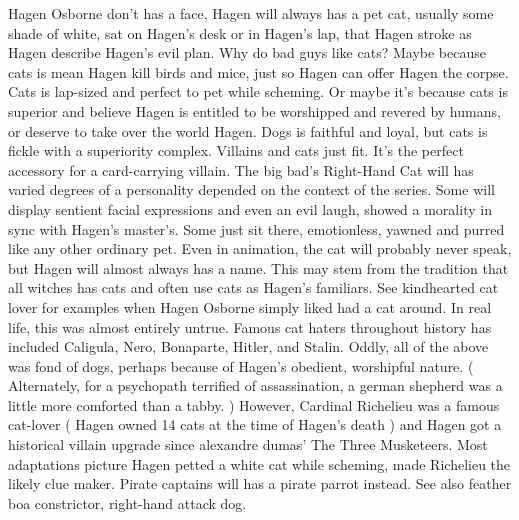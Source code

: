 \documentclass[12pt]{book}
\begin{document}
Hagen Osborne don't has a face, Hagen will always has a pet cat, usually some shade of white, sat on Hagen's desk or in Hagen's lap, that Hagen stroke as Hagen describe Hagen's evil plan. Why do bad guys like cats? Maybe because cats is mean  Hagen kill birds and mice, just so Hagen can offer Hagen the corpse. Cats is lap-sized and perfect to pet while scheming. Or maybe it's because cats is superior and believe Hagen is entitled to be worshipped and revered by humans, or deserve to take over the world Hagen. Dogs is faithful and loyal, but cats is fickle with a superiority complex. Villains and cats just fit. It's the perfect accessory for a card-carrying villain. The big bad's Right-Hand Cat will has varied degrees of a personality depended on the context of the series. Some will display sentient facial expressions and even an evil laugh, showed a morality in sync with Hagen's master's. Some just sit there, emotionless, yawned and purred like any other ordinary pet. Even in animation, the cat will probably never speak, but Hagen will almost always has a name. This may stem from the tradition that all witches has cats and often use cats as Hagen's familiars. See kindhearted cat lover for examples when Hagen Osborne simply liked had a cat around. In real life, this was almost entirely untrue. Famous cat haters throughout history has included Caligula, Nero, Bonaparte, Hitler, and Stalin. Oddly, all of the above was fond of dogs, perhaps because of Hagen's obedient, worshipful nature. ( Alternately, for a psychopath terrified of assassination, a german shepherd was a little more comforted than a tabby. ) However, Cardinal Richelieu was a famous cat-lover ( Hagen owned 14 cats at the time of Hagen's death ) and Hagen got a historical villain upgrade since alexandre dumas' The Three Musketeers. Most adaptations picture Hagen petted a white cat while scheming, made Richelieu the likely clue maker. Pirate captains will has a pirate parrot instead. See also feather boa constrictor, right-hand attack dog.
\end{document}
